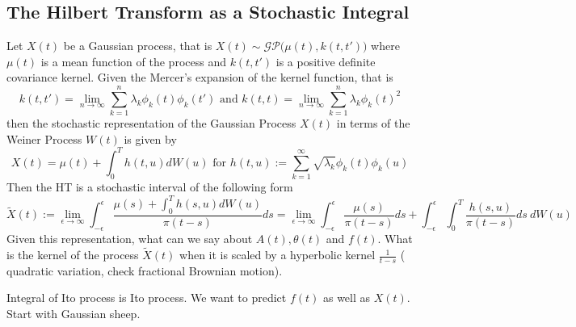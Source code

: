 \documentclass[article,moreauthors,pdftex,10pt,a4paper]{ssrn}
\begin{document}
\subsection{The Hilbert Transform as a Stochastic Integral}
Let $X(t)$ be  a Gaussian process, that is $X(t) \sim \mathcal{GP} \Big( \mu(t), k(t,t')\Big)$ where $\mu(t)$ is a mean function of the process and $k(t,t')$ is a positive definite  covariance kernel. Given the Mercer's expansion of the  kernel function, that is
\begin{equation}
k(t,t') = \lim_{n \rightarrow \infty} \sum_{k = 1}^n \lambda_k \phi_k(t) \phi_k(t') \text{ and } k(t,t) = \lim_{n \rightarrow \infty} \sum_{k = 1}^n \lambda_k \phi_k(t)^2 
\end{equation}
then the  stochastic representation of the Gaussian Process $X(t)$ in terms of the Weiner Process $W(t)$ is given by
\begin{equation}
X(t) = \mu(t) + \int_{0}^T h(t,u) dW(u) \text{ for } h(t,u):=  \sum_{k = 1}^\infty \sqrt{\lambda_k} \phi_k(t) \phi_k(u)
\end{equation}
Then the  HT is a stochastic interval of the following form
\begin{equation}
\tilde{X}(t) := \lim_{\epsilon \rightarrow \infty}\int_{-\epsilon}^{\epsilon} \frac{\mu(s) + \int_{0}^T h(s,u) dW(u)}{\pi (t-s)} ds = \lim_{\epsilon \rightarrow \infty}\int_{-\epsilon}^{\epsilon} \frac{\mu(s)}{\pi (t-s)} ds + \int_{-\epsilon}^{\epsilon} \int_{0}^T\frac{ h(s,u) }{\pi (t-s)} ds \ dW(u)
\end{equation}
Given this representation, what can we say about $A(t), \theta(t)$ and $f(t)$. What is the kernel of the process $\tilde{X}(t)$ when it is scaled by a hyperbolic kernel $\frac{1}{t-s}$ ( quadratic variation, check fractional Brownian motion).


Integral of Ito  process is Ito process. 
We want to predict $f(t)$ as well as $X(t)$. Start with Gaussian sheep.
\end{document}

